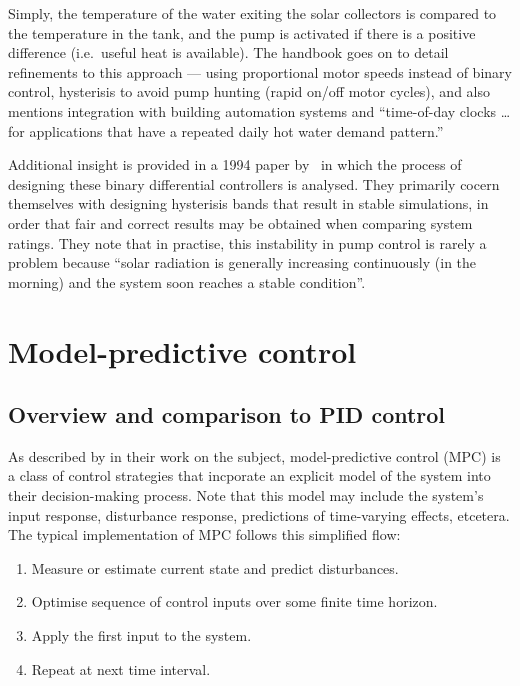 Simply, the temperature of the water exiting the solar collectors is compared to the temperature in the tank, and the pump is activated if there is a positive difference (i.e.\ useful heat is available).
The handbook goes on to detail refinements to this approach --- using proportional motor speeds instead of binary control, hysterisis to avoid pump hunting (rapid on/off motor cycles), and also mentions integration with building automation systems and ``time-of-day clocks \ldots for applications that have a repeated daily hot water demand pattern.''

Additional insight is provided in a 1994 paper by~\textcite{Beckman94} in which the process of designing these binary differential controllers is analysed.
They primarily cocern themselves with designing hysterisis bands that result in stable simulations, in order that fair and correct results may be obtained when comparing system ratings.
They note that in practise, this instability in pump control is rarely a problem because ``solar radiation is generally increasing continuously (in the morning) and the system soon reaches a stable condition''.

\section{Model-predictive control}

\subsection{Overview and comparison to PID control}

As described by \textcite{Camacho04} in their work on the subject, model-predictive control (MPC) is a class of control strategies that incporate an explicit model of the system into their decision-making process.
Note that this model may include the system's input response, disturbance response, predictions of time-varying effects, etcetera.
The typical implementation of MPC follows this simplified flow:

\begin{enumerate}
   \item Measure or estimate current state and predict disturbances.
   \item Optimise sequence of control inputs over some finite time horizon.
   \item Apply the first input to the system.
   \item Repeat at next time interval.
\end{enumerate}

